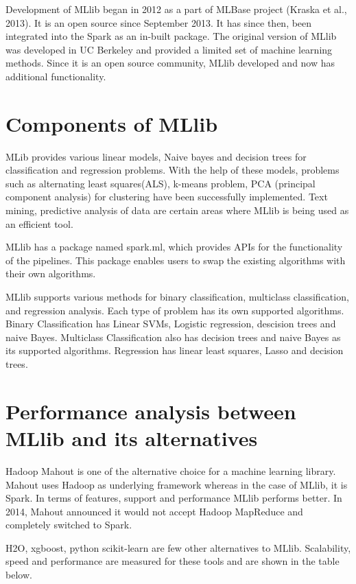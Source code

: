 \documentclass[9pt,twocolumn,twoside]{styles/osajnl}
\begin{document}
Development of MLlib began in 2012 as a part of MLBase project (Kraska
et al., 2013). It is an open source since September 2013. It has since
then, been integrated into the Spark as an in-built package. The
original version of MLlib was developed in UC Berkeley and provided a
limited set of machine learning methods. Since it is an open source
community, MLlib developed and now has additional functionality.
 

\section{Components of MLlib}

MLib provides various linear models, Naive bayes and decision trees
for classification and regression problems. With the help of these
models, problems such as alternating least squares(ALS), k-means
problem, PCA (principal component analysis) for clustering have been
successfully implemented. Text mining, predictive analysis of data are
certain areas where MLlib is being used as an efficient tool.

MLlib has a package named spark.ml, which provides APIs for the
functionality of the pipelines. This package enables users to swap the
existing algorithms with their own algorithms.\cite{MLlib-article}

MLlib supports various methods for binary classification, multiclass
classification, and regression analysis. Each type of problem has its
own supported algorithms. Binary Classification has Linear SVMs,
Logistic regression, descision trees and naive Bayes. Multiclass
Classification also has decision trees and naive Bayes as its
supported algorithms. Regression has linear least squares, Lasso and
decision trees.

\section{Performance analysis between MLlib and its alternatives}
Hadoop Mahout is one of the alternative choice for a machine learning
library. Mahout uses Hadoop as underlying framework whereas in the
case of MLlib, it is Spark. In terms of features, support and
performance MLlib performs better. In 2014, Mahout announced it would
not accept Hadoop MapReduce and completely switched to Spark.

H2O, xgboost, python scikit-learn are few other alternatives to
MLlib. Scalability, speed and performance are measured for these tools
and are shown in the table below.
\end{document}
